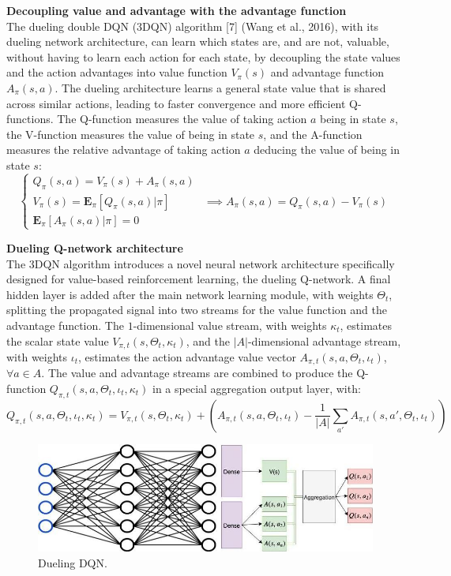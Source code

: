 \textbf{Decoupling value and advantage with the advantage function} \\
The dueling double DQN (3DQN) algorithm [7] (Wang et al., 2016), with its dueling network architecture, can learn which states are, and are not, valuable, without having to learn each action for each state, by decoupling the state values and the action advantages into value function $V_\pi(s)$ and advantage function $A_\pi(s,a)$. The dueling architecture learns a general state value that is shared across similar actions, leading to faster convergence and more efficient Q-functions. The Q-function measures the value of taking action $a$ being in state $s$, the V-function measures the value of being in state $s$, and the A-function measures the relative advantage of taking action $a$ deducing the value of being in state $s$:
\[ 
\begin{cases}
  Q_\pi(s,a) = V_\pi(s) + A_\pi(s,a) \\
  V_\pi(s) = \mathbf{E}_{\pi}[Q_\pi(s,a)|\pi] & \implies A_\pi(s,a) = Q_\pi(s,a) - V_\pi(s)\\
  \mathbf{E}_{\pi}[A_\pi(s,a)|\pi] = 0
\end{cases}
\]

\textbf{Dueling Q-network architecture} \\
The 3DQN algorithm introduces a novel neural network architecture specifically designed for value-based reinforcement learning, the dueling Q-network. A final hidden layer is added after the main network learning module, with weights $\Theta_t$, splitting the propagated signal into two streams for the value function and the advantage function. The $1$-dimensional value stream, with weights $\kappa_t$, estimates the scalar state value $V_{\pi,t}(s,\Theta_t,\kappa_t)$, and the $|A|$-dimensional advantage stream, with weights $\iota_t$, estimates the action advantage value vector $A_{\pi,t}(s,a,\Theta_t,\iota_t)$,  $\forall a \in A$. The value and advantage streams are combined to produce the Q-function $Q_{\pi,t}(s,a,\Theta_t,\iota_t,\kappa_t)$ in a special aggregation output layer, with:
\[ Q_{\pi,t}(s,a,\Theta_t,\iota_t,\kappa_t) = V_{\pi,t}(s,\Theta_t,\kappa_t) + (A_{\pi,t}(s,a,\Theta_t,\iota_t) - \frac{1}{|A|}\sum_{a'}A_{\pi,t}(s,a',\Theta_t,\iota_t)) \]

\begin{figure}
\includegraphics[scale=0.63]{img/I/Dueling-Q-architecture.jpg}
\centering
\caption{Dueling DQN.}
\end{figure}

